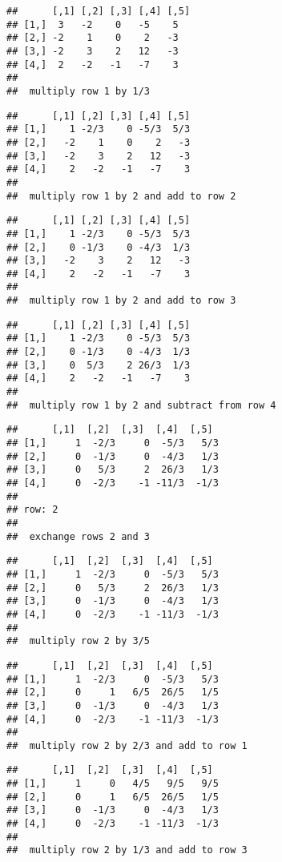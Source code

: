 \documentclass[
  10pt,
  a4paper,
]{article}
\begin{document}
\begin{verbatim}
##      [,1] [,2] [,3] [,4] [,5]
## [1,]  3   -2    0   -5    5  
## [2,] -2    1    0    2   -3  
## [3,] -2    3    2   12   -3  
## [4,]  2   -2   -1   -7    3  
## 
##  multiply row 1 by 1/3
\end{verbatim}

\begin{verbatim}
##      [,1] [,2] [,3] [,4] [,5]
## [1,]    1 -2/3    0 -5/3  5/3
## [2,]   -2    1    0    2   -3
## [3,]   -2    3    2   12   -3
## [4,]    2   -2   -1   -7    3
## 
##  multiply row 1 by 2 and add to row 2
\end{verbatim}

\begin{verbatim}
##      [,1] [,2] [,3] [,4] [,5]
## [1,]    1 -2/3    0 -5/3  5/3
## [2,]    0 -1/3    0 -4/3  1/3
## [3,]   -2    3    2   12   -3
## [4,]    2   -2   -1   -7    3
## 
##  multiply row 1 by 2 and add to row 3
\end{verbatim}

\begin{verbatim}
##      [,1] [,2] [,3] [,4] [,5]
## [1,]    1 -2/3    0 -5/3  5/3
## [2,]    0 -1/3    0 -4/3  1/3
## [3,]    0  5/3    2 26/3  1/3
## [4,]    2   -2   -1   -7    3
## 
##  multiply row 1 by 2 and subtract from row 4
\end{verbatim}

\begin{verbatim}
##      [,1]  [,2]  [,3]  [,4]  [,5] 
## [1,]     1  -2/3     0  -5/3   5/3
## [2,]     0  -1/3     0  -4/3   1/3
## [3,]     0   5/3     2  26/3   1/3
## [4,]     0  -2/3    -1 -11/3  -1/3
## 
## row: 2 
## 
##  exchange rows 2 and 3
\end{verbatim}

\begin{verbatim}
##      [,1]  [,2]  [,3]  [,4]  [,5] 
## [1,]     1  -2/3     0  -5/3   5/3
## [2,]     0   5/3     2  26/3   1/3
## [3,]     0  -1/3     0  -4/3   1/3
## [4,]     0  -2/3    -1 -11/3  -1/3
## 
##  multiply row 2 by 3/5
\end{verbatim}

\begin{verbatim}
##      [,1]  [,2]  [,3]  [,4]  [,5] 
## [1,]     1  -2/3     0  -5/3   5/3
## [2,]     0     1   6/5  26/5   1/5
## [3,]     0  -1/3     0  -4/3   1/3
## [4,]     0  -2/3    -1 -11/3  -1/3
## 
##  multiply row 2 by 2/3 and add to row 1
\end{verbatim}

\begin{verbatim}
##      [,1]  [,2]  [,3]  [,4]  [,5] 
## [1,]     1     0   4/5   9/5   9/5
## [2,]     0     1   6/5  26/5   1/5
## [3,]     0  -1/3     0  -4/3   1/3
## [4,]     0  -2/3    -1 -11/3  -1/3
## 
##  multiply row 2 by 1/3 and add to row 3
\end{verbatim}
\end{document}
